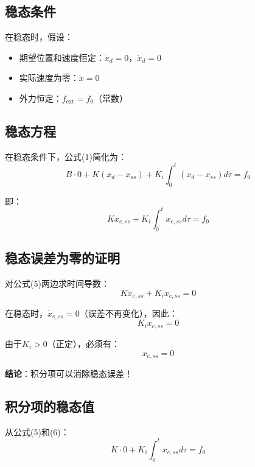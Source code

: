 \documentclass[12pt,a4paper]{article}
\begin{document}
\subsection{稳态条件}

在稳态时，假设：
\begin{itemize}
\item 期望位置和速度恒定：$\dot{x}_d = 0$，$\ddot{x}_d = 0$
\item 实际速度为零：$\dot{x} = 0$
\item 外力恒定：$f_{\text{ext}} = f_0$（常数）
\end{itemize}

\subsection{稳态方程}

在稳态条件下，公式(1)简化为：
\begin{equation}
B \cdot 0 + K(x_d - x_{ss}) + K_i \int_0^t (x_d - x_{ss}) d\tau = f_0
\end{equation}

即：
\begin{equation}
K x_{e,ss} + K_i \int_0^t x_{e,ss} d\tau = f_0 \tag{5}
\end{equation}

\subsection{稳态误差为零的证明}

对公式(5)两边求时间导数：
\begin{equation}
K \dot{x}_{e,ss} + K_i x_{e,ss} = 0
\end{equation}

在稳态时，$\dot{x}_{e,ss} = 0$（误差不再变化），因此：
\begin{equation}
K_i x_{e,ss} = 0
\end{equation}

由于$K_i > 0$（正定），必须有：
\begin{equation}
x_{e,ss} = 0 \tag{6}
\end{equation}

\textbf{结论}：积分项可以消除稳态误差！

\subsection{积分项的稳态值}

从公式(5)和(6)：
\begin{equation}
K \cdot 0 + K_i \int_0^t x_{e,ss} d\tau = f_0
\end{equation}
\end{document}
